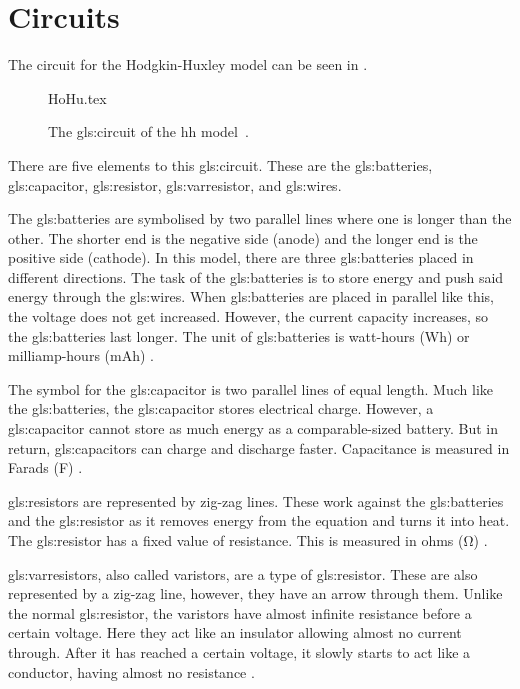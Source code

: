 \documentclass[../../Orator]{subfiles}
\begin{document}
 
 

\section{Circuits}
The circuit for the Hodgkin-Huxley model can be seen in . 

\begin{figure}[ht]
    \centering
    {HoHu.tex}
    \caption{The \gls{gls:circuit} of the \gls{hh} model~\cite{HodHux1952}.}\label{fig:HHcircuit}
\end{figure}
There are five elements to this \gls{gls:circuit}. These are the \gls{gls:batteries}, \gls{gls:capacitor}, \gls{gls:resistor}, \gls{gls:varresistor}, and \gls{gls:wires}. 

The \gls{gls:batteries} are symbolised by two parallel lines where one is longer than the other. The shorter end is the negative side (anode) and the longer end is the positive side (cathode). In this model, there are three \gls{gls:batteries} placed in different directions. The task of the \gls{gls:batteries} is to store energy and push said energy through the \gls{gls:wires}. When \gls{gls:batteries} are placed in parallel like this, the voltage does not get increased. However, the current capacity increases, so the \gls{gls:batteries} last longer. The unit of \gls{gls:batteries} is watt-hours (Wh) or milliamp-hours (mAh) \cite{}. 

The symbol for the \gls{gls:capacitor} is two parallel lines of equal length. Much like the \gls{gls:batteries}, the \gls{gls:capacitor} stores electrical charge. However, a \gls{gls:capacitor} cannot store as much energy as a comparable-sized battery. But in return, \gls{gls:capacitor}s can charge and discharge faster. Capacitance is measured in Farads (\unit{\farad}) \cite{}.

\gls{gls:resistor}s are represented by zig-zag lines. These work against the \gls{gls:batteries} and the \gls{gls:resistor} as it removes energy from the equation and turns it into heat. The \gls{gls:resistor} has a fixed value of resistance. This is measured in ohms (\unit{\ohm}) \cite{}.

\Glspl{gls:varresistor}, also called varistors, are a type of \gls{gls:resistor}. These are also represented by a zig-zag line, however, they have an arrow through them. Unlike the normal \gls{gls:resistor}, the varistors have almost infinite resistance before a certain voltage. Here they act like an insulator allowing almost no current through. After it has reached a certain voltage, it slowly starts to act like a conductor, having almost no resistance \cite{}. 
\end{document}
